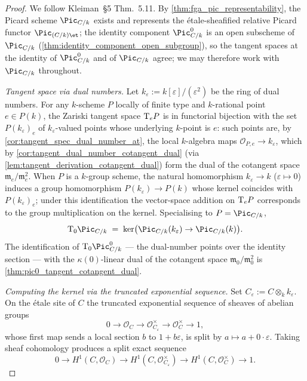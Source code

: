 \begin{proof}
  We follow Kleiman~\S 5 Thm.~5.11. By
  \cref{thm:fga_pic_representability}, the Picard scheme
  \(\Pic_{C/k}\) exists and represents the étale-sheafified relative
  Picard functor \(\Pic_{(C/k)\et}\); the identity component
  \(\Pic^0_{C/k}\) is an open subscheme of \(\Pic_{C/k}\)
  (\cref{thm:identity_component_open_subgroup}), so the tangent
  spaces at the identity of \(\Pic^0_{C/k}\) and of \(\Pic_{C/k}\)
  agree; we may therefore work with \(\Pic_{C/k}\) throughout.

  \emph{Tangent space via dual numbers.} Let
  \(k_\varepsilon := k[\varepsilon]/(\varepsilon^2)\) be the ring of
  dual numbers. For any \(k\)-scheme \(P\) locally of finite type and
  \(k\)-rational point \(e \in P(k)\), the Zariski tangent space
  \(\textup T_e P\) is in functorial bijection with the set
  \(P(k_\varepsilon)_e\) of \(k_\varepsilon\)-valued points whose
  underlying \(k\)-point is \(e\): such points are, by
  \cref{cor:tangent_spec_dual_number_at}, the local
  \(k\)-algebra maps \(\mathcal O_{P,e} \to k_\varepsilon\), which by
  \cref{cor:tangent_dual_number_cotangent_dual} (via
  \cref{lem:tangent_derivation_cotangent_dual}) form the dual of the
  cotangent space
  \(\mathfrak m_e/\mathfrak m_e^2\). When \(P\) is a \(k\)-group scheme,
  the natural homomorphism \(k_\varepsilon \to k\) (\(\varepsilon
  \mapsto 0\)) induces a group homomorphism
  \(P(k_\varepsilon) \to P(k)\) whose kernel coincides with
  \(P(k_\varepsilon)_e\); under this identification the vector-space
  addition on \(\textup T_e P\) corresponds to the group multiplication on
  the kernel. Specialising to \(P = \Pic_{C/k}\),
  \[
    \tu T_0 \Pic_{C/k}
    \;=\; \ker\bigl(\Pic_{C/k}(k_\varepsilon) \to \Pic_{C/k}(k)\bigr).
  \]
  The identification of \(\tu T_0 \Pic^0_{C/k}\) — the dual-number
  points over the identity section — with the
  \(\kappa(0)\)-linear dual of the cotangent space
  \(\mathfrak m_0/\mathfrak m_0^2\) is
  \cref{thm:pic0_tangent_cotangent_dual}.

  \emph{Computing the kernel via the truncated exponential sequence.}
  Set \(C_\varepsilon := C \otimes_k k_\varepsilon\). On the étale
  site of \(C\) the truncated exponential sequence of sheaves of
  abelian groups
  \[
    0 \to \mathcal{O}_C \to \mathcal{O}_{C_\varepsilon}^{\times}
        \to \mathcal{O}_C^{\times} \to 1,
  \]
  whose first map sends a local section \(b\) to \(1 + b\varepsilon\),
  is split by \(a \mapsto a + 0 \cdot \varepsilon\). Taking sheaf
  cohomology produces a split exact sequence
  \[
    0 \to H^1(C, \mathcal{O}_C)
      \to H^1(C, \mathcal{O}_{C_\varepsilon}^{\times})
      \to H^1(C, \mathcal{O}_C^{\times}) \to 1.
  \]


\end{proof}
